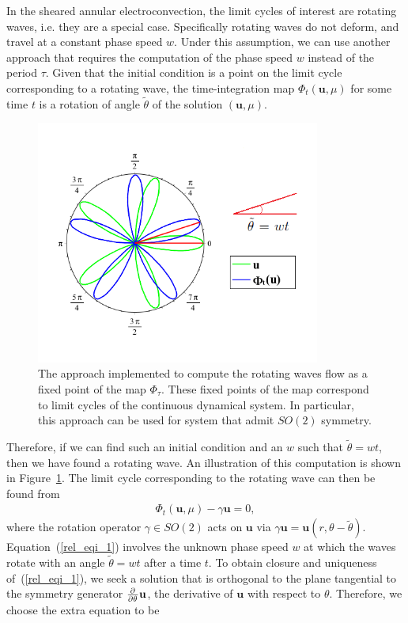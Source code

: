 In the sheared annular electroconvection, the limit cycles of interest are rotating waves, i.e. they are a special case. Specifically rotating waves do not deform, and travel at a constant phase speed $w$. Under this assumption, we can use another approach that requires the computation of the phase speed $w$ instead of the period $\tau$. Given that the initial condition is a point on the limit cycle corresponding to a rotating wave, the time-integration map $\Phi_t(\mathbf{u},\mu)$ for some time $t$ is a rotation of angle $\tilde{\theta}$ of the solution $(\mathbf{u},\mu)$.
\begin{figure}[t]
\centerline{\includegraphics[height=8cm,keepaspectratio]{./figures/Pictures/rel_equi.png}}
\caption{The approach implemented to compute the rotating waves flow as a fixed point of the map $\Phi_{\tau}$. These fixed points of the map correspond to limit cycles of the continuous dynamical system. In particular, this approach can be used for system that admit $SO(2)$ symmetry.}
\label{rel_equ_fig}
\end{figure}
Therefore, if we can find such an initial condition and an $w$ such that $\tilde{\theta} = wt$, then we have found a rotating wave. An illustration of this computation is shown in Figure~\ref{rel_equ_fig}. The limit cycle corresponding to the rotating wave can then be found from
\begin{align}
\label{rel_eqi_1}
\Phi_t(\mathbf{u},\mu) - \gamma\mathbf{u} = 0,
\end{align}
where the rotation operator $\gamma \in SO(2)$ acts on $\mathbf{u}$ via $\gamma\mathbf{u} = \mathbf{u}(r,\theta-\tilde{\theta})$.
Equation~(\ref{rel_eqi_1}) involves the unknown phase speed $w$ at which the waves rotate with an angle $\tilde{\theta} = wt$ after a time $t$. To obtain closure and uniqueness of~(\ref{rel_eqi_1}), we seek a solution that is orthogonal to the plane tangential to the symmetry generator $\frac{\partial^{}} {\partial \theta^{}}\mathbf{u}$, the derivative of $\mathbf{u}$ with respect to $\theta$. Therefore, we choose the extra equation to be

